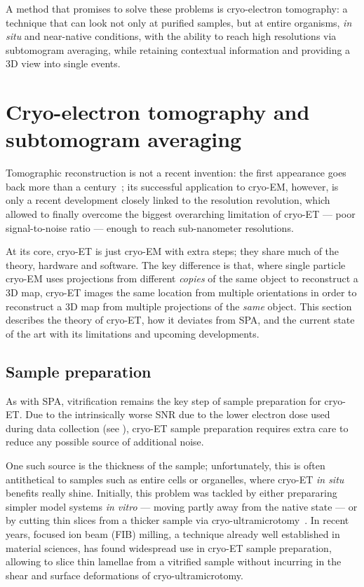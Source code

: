 A method that promises to solve these problems is cryo-electron tomography: a technique that can look not only at purified samples, but at entire organisms, \textit{in situ} and near-native conditions, with the ability to reach high resolutions via subtomogram averaging, while retaining contextual information and providing a 3D view into single events.


\section[Cryo-ET and STA]{Cryo-electron tomography and subtomogram averaging}

Tomographic reconstruction is not a recent invention: the first appearance goes back more than a century~\cite{jDeterminationFunctionsTheir1917}; its successful application to cryo-EM, however, is only a recent development closely linked to the resolution revolution, which allowed to finally overcome the biggest overarching limitation of cryo-ET --- poor signal-to-noise ratio --- enough to reach sub-nanometer resolutions.

At its core, cryo-ET is just cryo-EM with extra steps; they share much of the theory, hardware and software.
The key difference is that, where single particle cryo-EM uses projections from different \textit{copies} of the same object to reconstruct a 3D map, cryo-ET images the same location from multiple orientations in order to reconstruct a 3D map from multiple projections of the \textit{same} object.
This section describes the theory of cryo-ET, how it deviates from SPA, and the current state of the art with its limitations and upcoming developments.

\subsection{Sample preparation}
As with SPA, vitrification remains the key step of sample preparation for cryo-ET.
Due to the intrinsically worse SNR due to the lower electron dose used during data collection (see ), cryo-ET sample preparation requires extra care to reduce any possible source of additional noise.

One such source is the thickness of the sample; unfortunately, this is often antithetical to samples such as entire cells or organelles, where cryo-ET \textit{in situ} benefits really shine.
Initially, this problem was tackled by either prepararing simpler model systems \textit{in vitro} --- moving partly away from the native state --- or by cutting thin slices from a thicker sample via cryo-ultramicrotomy~\cite{peaseElectronMicroscopyUltramicrotomy1981}.
In recent years, focused ion beam (FIB) milling, a technique already well established in material sciences, has found widespread use in cryo-ET sample preparation, allowing to slice thin lamellae from a vitrified sample without incurring in the shear and surface deformations of cryo-ultramicrotomy.

